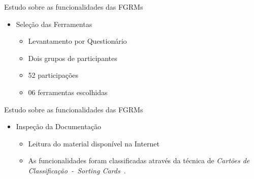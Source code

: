 \documentclass[t,14pt,mathserif]{beamer}
\begin{document}
\begin{frame}{Estudo sobre as funcionalidades das FGRMs}
    \begin{itemize}
        \item Seleção das Ferramentas
            \begin{itemize}
                \item Levantamento por Questionário
                \item Dois grupos de participantes
                \item 52 participações
                \item 06 ferramentas escolhidas
            \end{itemize}
    \end{itemize}
\end{frame}

\begin{frame}{Estudo sobre as funcionalidades das FGRMs}
    \begin{itemize}
        \item Inspeção da Documentação
            \begin{itemize}
                \item Leitura do material disponível na Internet
                \item As funcionalidades foram classificadas através da técnica
                    de \textit{Cartões de Classificação~-~Sorting
                        Cards}~\cite{just2008towards, mcgee2009software,
                        maiden1996acre}.
            \end{itemize}
    \end{itemize}
\end{frame}
\end{document}
